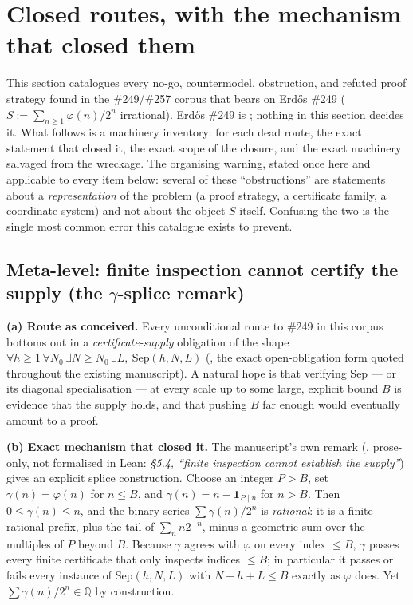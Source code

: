\section{Closed routes, with the mechanism that closed them}

This section catalogues every no-go, countermodel, obstruction, and refuted
proof strategy found in the \#249/\#257 corpus that bears on Erd\H{o}s \#249
(\(S := \sum_{n\ge1}\varphi(n)/2^n\) irrational). Erd\H{o}s \#249 is
; nothing in this section decides it. What follows is a machinery
inventory: for each dead route, the exact statement that closed it, the exact
scope of the closure, and the exact machinery salvaged from the wreckage.
The organising warning, stated once here and applicable to every item below:
several of these ``obstructions'' are statements about a
\emph{representation} of the problem (a proof strategy, a certificate
family, a coordinate system) and not about the object \(S\) itself. Confusing
the two is the single most common error this catalogue exists to prevent.

\subsection{Meta-level: finite inspection cannot certify the supply (the
\texorpdfstring{\(\gamma\)}{gamma}-splice remark)}

\textbf{(a) Route as conceived.} Every unconditional route to \#249 in this
corpus bottoms out in a \emph{certificate-supply} obligation of the shape
\(\forall h\ge1\,\forall N_0\,\exists N\ge N_0\,\exists L,\ \mathrm{Sep}(h,N,L)\)
(, the exact
open-obligation form quoted throughout the existing manuscript). A natural
hope is that verifying \(\mathrm{Sep}\) — or its diagonal specialisation — at
every scale up to some large, explicit bound \(B\) is evidence that the
supply holds, and that pushing \(B\) far enough would eventually amount to a
proof.

\textbf{(b) Exact mechanism that closed it.} The manuscript's own remark
(, prose-only, not formalised in Lean:
\emph{\S5.4, ``finite inspection cannot establish the supply''}) gives an
explicit splice construction. Choose an integer \(P>B\), set
\(\gamma(n)=\varphi(n)\) for \(n\le B\), and \(\gamma(n)=n-\mathbf 1_{P\mid n}\)
for \(n>B\). Then \(0\le\gamma(n)\le n\), and the binary series
\(\sum\gamma(n)/2^n\) is \emph{rational}: it is a finite rational prefix, plus
the tail of \(\sum_n n2^{-n}\), minus a geometric sum over the multiples of
\(P\) beyond \(B\). Because \(\gamma\) agrees with \(\varphi\) on every index
\(\le B\), \(\gamma\) passes every finite certificate that only inspects
indices \(\le B\); in particular it passes or fails every instance of
\(\mathrm{Sep}(h,N,L)\) with \(N+h+L\le B\) exactly as \(\varphi\) does. Yet
\(\sum\gamma(n)/2^n\in\mathbb Q\) by construction.

